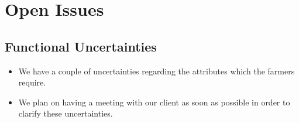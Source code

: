 \documentclass[11pt,fleqn]{book} %
\begin{document}


\chapter{Open Issues}

\section{Functional Uncertainties}
\begin{itemize}
	\item We have a couple of uncertainties regarding the attributes which the farmers require.
	\item We plan on having a meeting with our client as soon as possible in order to clarify these uncertainties.
\end{itemize}
\end{document}
